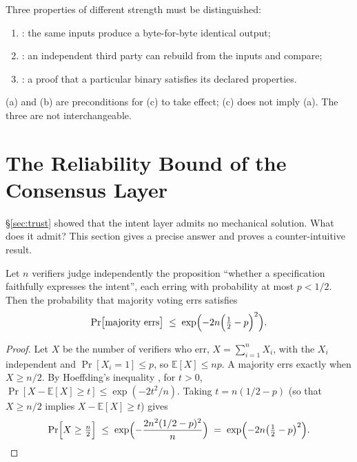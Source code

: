 \begin{principle}\label{pr:reproducible}
Three properties of different strength must be distinguished:
\begin{enumerate}[label=(\alph*)]
\item {}: the same inputs produce a byte-for-byte identical output;
\item {}: an independent third party can rebuild from the inputs and compare;
\item {}: a proof that a particular binary satisfies its declared properties.
\end{enumerate}
(a) and (b) are preconditions for (c) to take effect; (c) does not imply (a). The three are
not interchangeable.
\end{principle}

\section{The Reliability Bound of the Consensus Layer}\label{sec:consensus}

\S\ref{sec:trust} showed that the intent layer admits no mechanical solution. What does it
admit? This section gives a precise answer and proves a counter-intuitive result.

\begin{theorem}\label{th:condorcet}
Let $n$ verifiers judge independently the proposition ``whether a specification faithfully
expresses the intent'', each erring with probability at most $p < 1/2$. Then the probability
that majority voting errs satisfies
\begin{equation}\label{eq:chernoff}
\Pr\bigl[\text{majority errs}\bigr] \;\le\; \exp\Bigl(-2n\Bigl(\tfrac{1}{2} - p\Bigr)^{2}\Bigr).
\end{equation}
\end{theorem}

\begin{proof}
Let $X$ be the number of verifiers who err, $X = \sum_{i=1}^{n} X_i$, with the $X_i$
independent and $\Pr[X_i = 1] \le p$, so $\mathbb{E}[X] \le np$. A majority errs exactly
when $X \ge n/2$. By Hoeffding's inequality \cite{hoeffding1963}, for $t > 0$,
$\Pr[X - \mathbb{E}[X] \ge t] \le \exp(-2t^{2}/n)$. Taking
$t = n(1/2 - p)$ (so that $X \ge n/2$ implies $X - \mathbb{E}[X] \ge t$) gives
\[
\Pr\Bigl[X \ge \tfrac{n}{2}\Bigr] \;\le\;
\exp\Bigl(-\frac{2n^{2}(1/2 - p)^{2}}{n}\Bigr) \;=\;
\exp\Bigl(-2n\bigl(\tfrac{1}{2} - p\bigr)^{2}\Bigr). \qedhere
\]
\end{proof}

